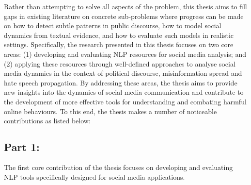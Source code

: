 Rather than attempting to solve all aspects of the problem, this thesis aims to fill gaps in existing literature on concrete sub-problems where progress can be made on how to detect subtle patterns in public discourse, how to model social dynamics from textual evidence, and how to evaluate such models in realistic settings. Specifically, the research presented in this thesis focuses on two core areas: (1) developing and evaluating \ac{NLP} resources for social media analysis; and (2) applying these resources through well-defined approaches to analyse social media dynamics in the context of political discourse, misinformation spread and hate speech propagation. By addressing these areas, the thesis aims to provide new insights into the dynamics of social media communication and contribute to the development of more effective tools for understanding and combating harmful online behaviours. To this end, the thesis makes a number of noticeable contributions as listed below:

\subsection{Part 1: \PARTONE} \label{ch:intro:contributions}
The first core contribution of the thesis focuses on developing and evaluating \ac{NLP} tools specifically designed for social media applications. \label{ch:intro:contributions:1}

